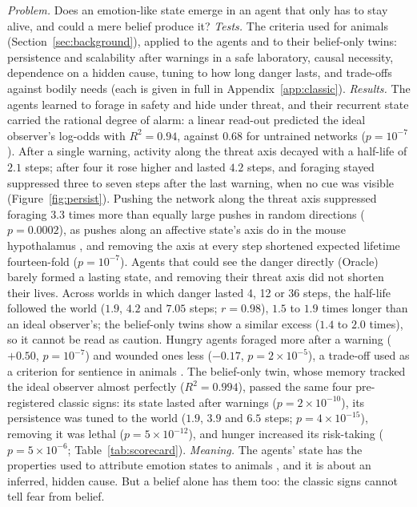 \documentclass[11pt]{article}
\begin{document}
\emph{Problem.} Does an emotion-like state emerge in an agent that only has to stay alive, and could a mere belief produce it? \emph{Tests.} The criteria used for animals (Section~\ref{sec:background}), applied to the agents and to their belief-only twins: persistence and scalability after warnings in a safe laboratory, causal necessity, dependence on a hidden cause, tuning to how long danger lasts, and trade-offs against bodily needs (each is given in full in Appendix~\ref{app:classic}). \emph{Results.} The agents learned to forage in safety and hide under threat, and their recurrent state carried the rational degree of alarm: a linear read-out predicted the ideal observer's log-odds with $R^2=0.94$, against $0.68$ for untrained networks ($p=10^{-7}$). After a single warning, activity along the threat axis decayed with a half-life of $2.1$ steps; after four it rose higher and lasted $4.2$ steps, and foraging stayed suppressed three to seven steps after the last warning, when no cue was visible (Figure~\ref{fig:persist}). Pushing the network along the threat axis suppressed foraging $3.3$ times more than equally large pushes in random directions ($p=0.0002$), as pushes along an affective state's axis do in the mouse hypothalamus \cite{vinograd2024causal}, and removing the axis at every step shortened expected lifetime fourteen-fold ($p=10^{-7}$). Agents that could see the danger directly (Oracle) barely formed a lasting state, and removing their threat axis did not shorten their lives. Across worlds in which danger lasted 4, 12 or 36 steps, the half-life followed the world ($1.9$, $4.2$ and $7.05$ steps; $r=0.98$), $1.5$ to $1.9$ times longer than an ideal observer's; the belief-only twins show a similar excess ($1.4$ to $2.0$ times), so it cannot be read as caution. Hungry agents foraged more after a warning ($+0.50$, $p=10^{-7}$) and wounded ones less ($-0.17$, $p=2\times10^{-5}$), a trade-off used as a criterion for sentience in animals \cite{elwood2009hermit}. The belief-only twin, whose memory tracked the ideal observer almost perfectly ($R^2=0.994$), passed the same four pre-registered classic signs: its state lasted after warnings ($p=2\times10^{-10}$), its persistence was tuned to the world ($1.9$, $3.9$ and $6.5$ steps; $p=4\times10^{-15}$), removing it was lethal ($p=5\times10^{-12}$), and hunger increased its risk-taking ($p=5\times10^{-6}$; Table~\ref{tab:scorecard}). \emph{Meaning.} The agents' state has the properties used to attribute emotion states to animals \cite{anderson2014framework}, and it is about an inferred, hidden cause. But a belief alone has them too: the classic signs cannot tell fear from belief.
\end{document}
